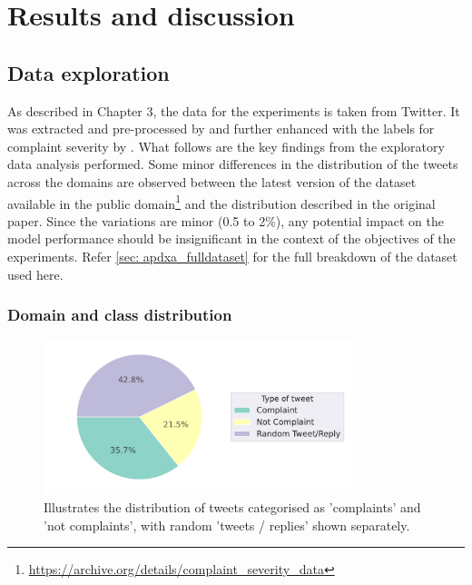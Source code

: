 \chapter{Results and discussion}

\section{Data exploration}
As described in Chapter 3, the data for the experiments is taken from Twitter. It was extracted and pre-processed by \cite{preotiuc-pietro_automatically_2019} and further enhanced with the labels for complaint severity by \cite{jinModelingSeverityComplaints2021}. What follows are the key findings from the exploratory data analysis performed. Some minor differences in the distribution of the tweets across the domains are observed between the latest version of the dataset available in the public domain\footnote{\url{https://archive.org/details/complaint_severity_data}} and the distribution described in the original paper. Since the variations are minor (0.5 to 2\%), any potential impact on the model performance should be insignificant in the context of the objectives of the experiments. Refer \ref{sec: apdxa_fulldataset} for the full breakdown of the dataset used here.

\subsection{Domain and class distribution}
\begin{figure}[htb]
    \centering
    \includegraphics[width=9cm]{figures/compl_non_random_dist.pdf}
    \vspace*{-3mm}
    \caption{Illustrates the distribution of tweets categorised as 'complaints' and 'not complaints', with random 'tweets / replies' shown separately.}
    \label{fig: compl_non_random_dist}
\end{figure}



